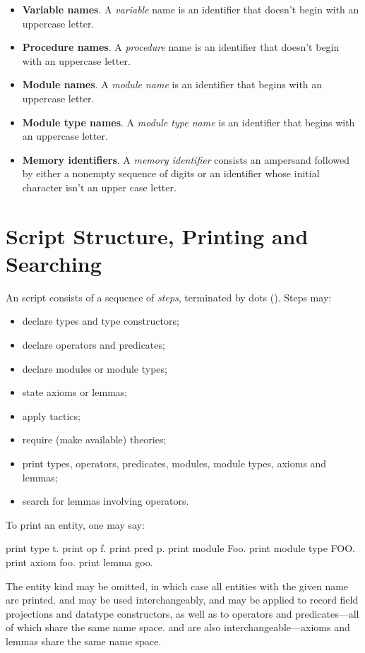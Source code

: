 \begin{itemize}
\item \textbf{Variable names}. A \emph{variable} name is an identifier
  that doesn't begin with an uppercase letter.

\item \textbf{Procedure names}. A \emph{procedure} name is an identifier
  that doesn't begin with an uppercase letter.

\item \textbf{Module names}. A \emph{module name} is an identifier that
  begins with an uppercase letter.

\item \textbf{Module type names}. A \emph{module type name} is an
  identifier that begins with an uppercase letter.

\item \textbf{Memory identifiers}. A \emph{memory identifier} consists
  an ampersand followed by either a nonempty sequence of digits or an
  identifier whose initial character isn't an upper case letter.
\end{itemize}

\section{Script Structure, Printing and Searching}

An \EasyCrypt script consists of a sequence of \emph{steps},
terminated by dots (). Steps may:
\begin{itemize}
\item declare types and type constructors;

\item declare operators and predicates;

\item declare modules or module types;

\item state axioms or lemmas;

\item apply tactics;

\item require (make available) theories;

\item print types, operators, predicates, modules, module types,
  axioms and lemmas;

\item search for lemmas involving operators.
\end{itemize}

To print an entity, one may say:
\begin{easycrypt}{}{}
print type t.
print op f.
print pred p.
print module Foo.
print module type FOO.
print axiom foo.
print lemma goo.
\end{easycrypt}
The entity kind may be omitted, in which case all entities with the
given name are printed.  and  may be used
interchangeably, and may be applied to record field projections and
datatype constructors, as well as to operators and predicates---all of which
share the same name space.
 and  are also interchangeable---axioms
and lemmas share the same name space.

